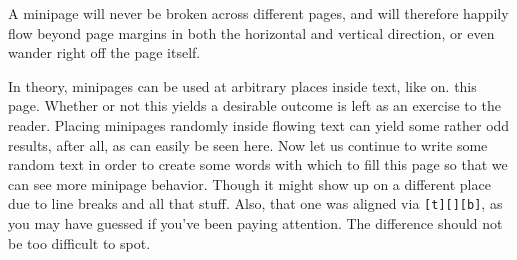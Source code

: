 \documentclass{article}
\begin{document}
\newpage
\noindent{}
\hspace{0.01\textwidth}
\noindent\begin{minipage}[t][][t]{0.32\textwidth}
        A  minipage will  never be  broken  across different  pages, and  will
        therefore happily flow beyond page  margins in both the horizontal and
        vertical direction, or even wander right off the page itself.
\end{minipage}
\hspace{0.01\textwidth}
\noindent{}

\newpage

In theory,  minipages can be  used at arbitrary  places inside text,  like on.
this  page.
Whether or not this  yields a desirable outcome is left as  an exercise to the
reader.  Placing minipages randomly inside  flowing text can yield some rather
odd results, after all, as can easily be seen here.
Now let us  continue to write some  random text in order to  create some words
with which to fill this page so that we can see more minipage behavior.
Though it might show  up on a different place due to line  breaks and all that
stuff. Also,  that one  was aligned  via  \texttt{[t][][b]}, as  you may  have
guessed if you've been paying attention.
The difference should not be too difficult to spot.

\end{document}
